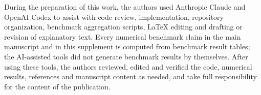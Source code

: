 \documentclass[11pt,a4paper]{article}
\begin{document}
During the preparation of this work, the authors used Anthropic Claude and
OpenAI Codex to assist with code review, implementation, repository
organization, benchmark aggregation scripts, LaTeX editing and drafting or
revision of explanatory text.  Every numerical benchmark claim in the main
manuscript and in this supplement is computed from benchmark result tables;
the AI-assisted tools did not generate benchmark results by themselves.  After
using these tools, the authors reviewed, edited and verified the code,
numerical results, references and manuscript content as needed, and take full
responsibility for the content of the publication.

\nocite{geladi1986partial,wold2001pls,dejong1993simpls,hoerl1970ridge,rinnan2009review,savitzky1964smoothing,barnes1989standard,geladi1985linearization}



\end{document}
